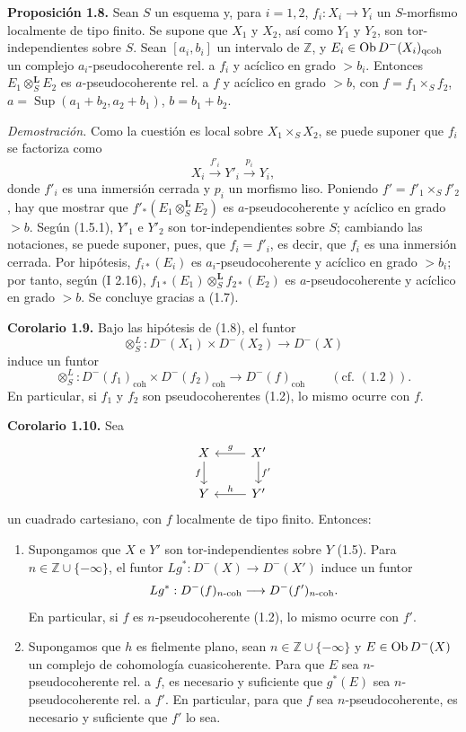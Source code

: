 \textbf{Proposición 1.8.} Sean \(S\) un esquema y, para \(i=1,2\), \(f_i:X_i\longrightarrow Y_i\) un \(S\)-morfismo localmente de tipo finito. Se supone que \(X_1\) y \(X_2\), así como \(Y_1\) y \(Y_2\), son tor-independientes sobre \(S\). Sean \([a_i,b_i]\) un intervalo de \(\mathbb Z\), y \(E_i\in\operatorname{Ob} D^{-}(X_i)_{\mathrm{qcoh}}\) un complejo \(a_i\)-pseudocoherente rel. a \(f_i\) y acíclico en grado \(>b_i\). Entonces \(E_1\otimes_S^{\mathbf L}E_2\) es \(a\)-pseudocoherente rel. a \(f\) y acíclico en grado \(>b\), con \(f=f_1\times_Sf_2\), \(a=\operatorname{Sup}(a_1+b_2,a_2+b_1)\), \(b=b_1+b_2\).

\emph{Demostración.} Como la cuestión es local sobre \(X_1\times_SX_2\), se puede suponer que \(f_i\) se factoriza como
\[
 X_i\xrightarrow{f'_i}Y'_i\xrightarrow{p_i}Y_i,
\]
donde \(f'_i\) es una inmersión cerrada y \(p_i\) un morfismo liso. Poniendo \(f'=f'_1\times_Sf'_2\), hay que mostrar que \(f'_*(E_1\otimes_S^{\mathbf L}E_2)\) es \(a\)-pseudocoherente y acíclico en grado \(>b\). Según (1.5.1), \(Y'_1\) e \(Y'_2\) son tor-independientes sobre \(S\); cambiando las notaciones, se puede suponer, pues, que \(f_i=f'_i\), es decir, que \(f_i\) es una inmersión cerrada. Por hipótesis, \(f_{i*}(E_i)\) es \(a_i\)-pseudocoherente y acíclico en grado \(>b_i\); por tanto, según (I 2.16), \(f_{1*}(E_1)\otimes_S^{\mathbf L}f_{2*}(E_2)\) es \(a\)-pseudocoherente y acíclico en grado \(>b\). Se concluye gracias a (1.7).

\textbf{Corolario 1.9.} Bajo las hipótesis de (1.8), el funtor
\[
 \otimes_S^{L}:D^{-}(X_1)\times D^{-}(X_2)\longrightarrow D^{-}(X)
\]
induce un funtor
\[
 \otimes_S^{L}:D^{-}(f_1)_{\mathrm{coh}}\times D^{-}(f_2)_{\mathrm{coh}}
 \longrightarrow D^{-}(f)_{\mathrm{coh}}\qquad(\text{cf. }(1.2)).
\]
En particular, si \(f_1\) y \(f_2\) son pseudocoherentes (1.2), lo mismo ocurre con \(f\).

\textbf{Corolario 1.10.} Sea
\[
\begin{tikzcd}
X \arrow[d,"f"'] & X' \arrow[l,"g"'] \arrow[d,"f'"]\\
Y & Y' \arrow[l,"h"']
\end{tikzcd}
\]
un cuadrado cartesiano, con \(f\) localmente de tipo finito. Entonces:
\begin{enumerate}[label=\alph*)]
\item Supongamos que \(X\) e \(Y'\) son tor-independientes sobre \(Y\) (1.5). Para \(n\in\mathbb Z\cup\{-\infty\}\), el funtor \(Lg^*:D^{-}(X)\to D^{-}(X')\) induce un funtor
\[
 Lg^*:D^{-}(f)_{n\text{-}\mathrm{coh}}\longrightarrow D^{-}(f')_{n\text{-}\mathrm{coh}}.
\]
En particular, si \(f\) es \(n\)-pseudocoherente (1.2), lo mismo ocurre con \(f'\).

\item Supongamos que \(h\) es fielmente plano, sean \(n\in\mathbb Z\cup\{-\infty\}\) y \(E\in\operatorname{Ob} D^{-}(X)\) un complejo de cohomología cuasicoherente. Para que \(E\) sea \(n\)-pseudocoherente rel. a \(f\), es necesario y suficiente que \(g^*(E)\) sea \(n\)-pseudocoherente rel. a \(f'\). En particular, para que \(f\) sea \(n\)-pseudocoherente, es necesario y suficiente que \(f'\) lo sea.
\end{enumerate}

